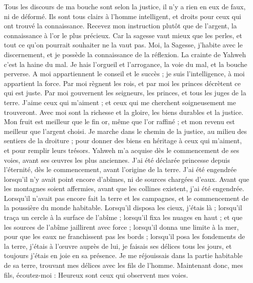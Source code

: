 \begin{multicols}{2}
Tous les discours de ma bouche sont selon la justice, il n'y a rien en eux de faux, ni de déformé.
Ils sont tous clairs à l'homme intelligent, et droits pour ceux qui ont trouvé la connaissance.
Recevez mon instruction plutôt que de l'argent, la connaissance à l'or le plus précieux.
Car la sagesse vaut mieux que les perles, et tout ce qu'on pourrait souhaiter ne la vaut pas.
Moi, la Sagesse, j'habite avec le discernement, et je possède la connaissance de la réflexion.
La crainte de Yahweh c'est la haine du mal. Je hais l'orgueil et l'arrogance, la voie du mal, et la bouche perverse.
A moi appartiennent le conseil et le succès ; je suis l'intelligence, à moi appartient la force.
Par moi règnent les rois, et par moi les princes décrètent ce qui est juste.
Par moi gouvernent les seigneurs, les princes, et tous les juges de la terre.
J'aime ceux qui m'aiment ; et ceux qui me cherchent soigneusement me trouveront.
Avec moi sont la richesse et la gloire, les biens durables et la justice.
Mon fruit est meilleur que le fin or, même que l'or raffiné ; et mon revenu est meilleur que l'argent choisi.
Je marche dans le chemin de la justice, au milieu des sentiers de la droiture ;
pour donner des biens en héritage à ceux qui m'aiment, et pour remplir leurs trésors.
Yahweh m'a acquise dès le commencement de ses voies, avant ses œuvres les plus anciennes.
J'ai été déclarée princesse depuis l'éternité, dès le commencement, avant l'origine de la terre.
J'ai été engendrée lorsqu'il n'y avait point encore d'abîmes, ni de sources chargées d'eaux.
Avant que les montagnes soient affermies, avant que les collines existent, j'ai été engendrée.
Lorsqu'il n'avait pas encore fait la terre et les campagnes, et le commencement de la poussière du monde habitable.
Lorsqu'il disposa les cieux, j'étais là ; lorsqu'il traça un cercle à la surface de l'abîme ;
lorsqu'il fixa les nuages en haut ; et que les sources de l'abîme jaillirent avec force ;
lorsqu'il donna une limite à la mer, pour que les eaux ne franchissent pas les bords ; lorsqu'il posa les fondements de la terre,
j'étais à l'œuvre auprès de lui, je faisais ses délices tous les jours, et toujours j'étais en joie en sa présence.
Je me réjouissais dans la partie habitable de sa terre, trouvant mes délices avec les fils de l'homme.
Maintenant donc, mes fils, écoutez-moi : Heureux sont ceux qui observent mes voies.

\end{multicols}
